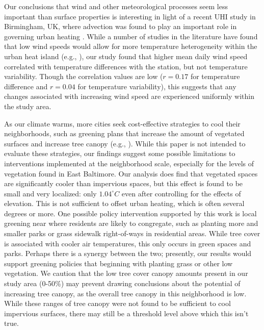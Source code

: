 Our conclusions that wind and other meteorological processes seem less important than surface properties is interesting in light of a recent UHI study in Birmingham, UK, where advection was found to play an important role in governing urban heating \citep{birminghamadvection1}. 
While a number of studies in the literature have found that low wind speeds would allow for more temperature heterogeneity within the urban heat island (e.g., \citet{oke82, madisonUHI}), our study found that higher mean daily wind speed correlated with temperature differences with the station, but not temperature variability. Though the correlation values are low ($r=0.17$ for temperature difference and $r=0.04$ for temperature variability), this suggests that any changes associated with increasing wind speed are experienced uniformly within the study area.

As our climate warms, more cities seek cost-effective strategies to cool their neighborhoods, such as greening plans that increase the amount of vegetated surfaces and increase tree canopy (e.g., \citet{kleerekoper2012}). While this paper is not intended to evaluate these strategies, our findings suggest some possible limitations to interventions implemented at the neighborhood scale, especially for the levels of vegetation found in East Baltimore. 
 Our analysis does find that vegetated spaces are significantly cooler than impervious spaces, but this effect is found to be small and very localized: only $1.04 ^{\circ} C$ even after controlling for the effects of elevation. This is not sufficient to offset urban heating, which is often several degrees or more. 
 One possible policy intervention supported by this work is local greening near where residents are likely to congregate, such as planting more and smaller parks or grass sidewalk right-of-ways in residential areas. While tree cover is associated with cooler air temperatures, this only occurs in green spaces and parks. Perhaps there is a synergy between the two; presently, our results would support greening policies that beginning with planting grass or other low vegetation. We caution that the low tree cover canopy amounts present in our study area (0-50\%) may prevent drawing conclusions about the potential of increasing tree canopy, as the overall tree canopy in this neighborhood is low. While these ranges of tree canopy were not found to be sufficient to cool impervious surfaces, there may still be a threshold level above which this isn't true. 
 
